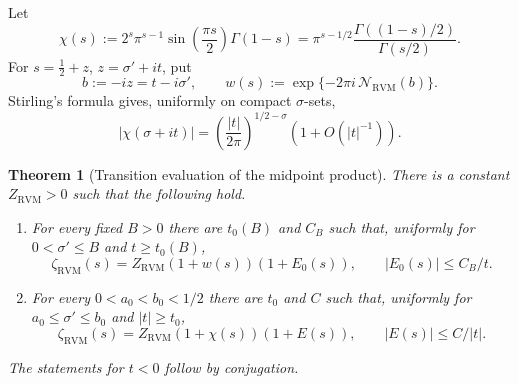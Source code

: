\documentclass[11pt,reqno]{amsart}
\newtheorem{theorem}{Theorem}[section]
\theoremstyle{definition}
\theoremstyle{remark}
\newcommand{\RVM}{\mathrm{RVM}}
\begin{document}
Let
\begin{equation}\label{eq:chi}
 \chi(s)
 :=2^s\pi^{s-1}\sin\!\left(\frac{\pi s}{2}\right)\Gamma(1-s)
 =\pi^{s-1/2}\frac{\Gamma((1-s)/2)}{\Gamma(s/2)}.
\end{equation}
For $s=\tfrac12+z$, $z=\sigma'+it$, put
\begin{equation}\label{eq:transition-bw}
 b:=-iz=t-i\sigma',\qquad
 w(s):=\exp\{-2\pi i\,\mathcal N_{\RVM}(b)\}.
\end{equation}
Stirling's formula gives, uniformly on compact $\sigma$-sets,
\begin{equation}\label{eq:chi-size}
 |\chi(\sigma+it)|
 =\left(\frac{|t|}{2\pi}\right)^{1/2-\sigma}(1+O(|t|^{-1})).
\end{equation}

\begin{theorem}[Transition evaluation of the midpoint product]\label{thm:transition}
There is a constant $Z_{\RVM}>0$ such that the following hold.
\begin{enumerate}[label=\textup{(\alph*)}]
\item For every fixed $B>0$ there are $t_0(B)$ and $C_B$ such that, uniformly for $0<\sigma'\le B$ and $t\ge t_0(B)$,
\begin{equation}\label{eq:transition-w}
 \boxed{\zeta_{\RVM}(s)=Z_{\RVM}(1+w(s))(1+E_0(s)),\qquad |E_0(s)|\le C_B/t.}
\end{equation}
\item For every $0<a_0<b_0<1/2$ there are $t_0$ and $C$ such that, uniformly for $a_0\le\sigma'\le b_0$ and $|t|\ge t_0$,
\begin{equation}\label{eq:transition-chi}
 \boxed{\zeta_{\RVM}(s)=Z_{\RVM}(1+\chi(s))(1+E(s)),\qquad |E(s)|\le C/|t|.}
\end{equation}
\end{enumerate}
The statements for $t<0$ follow by conjugation.
\end{theorem}
\end{document}

